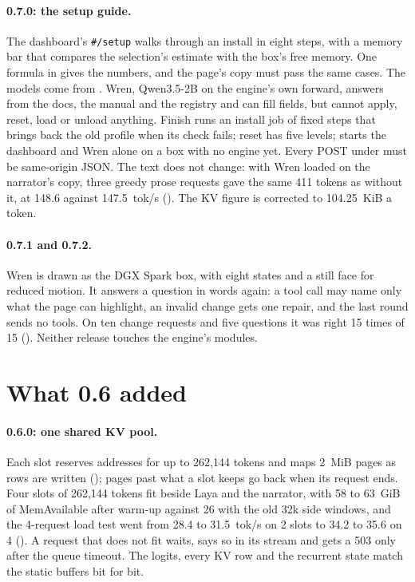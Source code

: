 \paragraph{0.7.0: the setup guide.} The dashboard's \texttt{\#/setup} walks through an install in eight steps, with a memory bar that compares the selection's estimate with the box's free memory. One formula in  gives the numbers, and the page's copy must pass the same cases. The models come from . Wren, Qwen3.5-2B on the engine's own forward, answers from the docs, the manual and the registry and can fill fields, but cannot apply, reset, load or unload anything. Finish runs an install job of fixed steps that brings back the old profile when its check fails; reset has five levels;  starts the dashboard and Wren alone on a box with no engine yet. Every POST under  must be same-origin JSON. The text does not change: with Wren loaded on the narrator's copy, three greedy prose requests gave the same 411 tokens as without it, at 148.6 against 147.5~tok/s (\measured). The KV figure is corrected to 104.25~KiB a token.

\paragraph{0.7.1 and 0.7.2.} Wren is drawn as the DGX Spark box, with eight states and a still face for reduced motion. It answers a question in words again: a tool call may name only what the page can highlight, an invalid change gets one repair, and the last round sends no tools. On ten change requests and five questions it was right 15 times of 15 (\measured). Neither release touches the engine's modules.

\section{What 0.6 added}

\paragraph{0.6.0: one shared KV pool.} Each slot reserves addresses for up to 262,144 tokens and maps 2~MiB pages as rows are written (); pages past what a slot keeps go back when its request ends. Four slots of 262,144 tokens fit beside Laya and the narrator, with 58 to 63~GiB of MemAvailable after warm-up against 26 with the old 32k side windows, and the 4-request load test went from 28.4 to 31.5~tok/s on 2 slots to 34.2 to 35.6 on 4 (\measured). A request that does not fit waits, says so in its stream and gets a 503  only after the queue timeout. The logits, every KV row and the recurrent state match the static buffers bit for bit.

